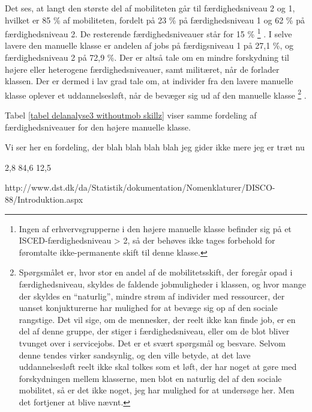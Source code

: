 Det ses, at langt den største del af mobiliteten går til færdighedsniveau 2 og 1, hvilket er 85 \% af mobiliteten, fordelt på 23 \% på færdighedsniveau 1 og 62 \% på færdighedsniveau 2. De resterende færdighedsniveauer står for 15 \%%
%
    \footnote{ Ingen af erhvervsgrupperne i den højere manuelle klasse befinder sig på et ISCED-færdighedsniveau > 2, så der behøves ikke tages forbehold for føromtalte ikke-permanente skift til denne klasse.}%
%
.  I selve lavere den manuelle klasse er andelen af jobs på færdigsniveau 1 på 27,1 \%, og færdighedsniveau 2 på 72,9 \%. Der er altså tale om en mindre forskydning til højere eller heterogene færdighedsniveauer, samt militæret, når de forlader klassen. Der er dermed i lav grad tale om, at individer fra den lavere manuelle klasse oplever et uddannelsesløft, når de bevæger sig ud af den manuelle klasse%
%
    \footnote{ Spørgsmålet er, hvor stor en andel af de mobilitetsskift, der foregår opad i færdighedsniveau, skyldes de faldende jobmuligheder i klassen, og hvor mange der skyldes en “naturlig”, mindre strøm af individer med ressourcer, der uanset konjukturerne har mulighed for at bevæge sig op af den sociale rangstige. Det vil sige, om de mennesker, der reelt ikke kan finde job, er en del af denne gruppe, der stiger i færdighedsniveau, eller om de blot bliver tvunget over i servicejobs. Det er et svært spørgsmål og besvare. Selvom denne tendes virker sandsynlig, og den ville betyde, at det lave uddannelsesløft reelt ikke skal tolkes som et løft, der har noget at gøre med forskydningen mellem klasserne, men blot en naturlig del af den sociale mobilitet, så er det ikke noget, jeg har mulighed for at undersøge her. Men det fortjener at blive nævnt.}%
%
. 

Tabel \ref{tabel delanalyse3 withoutmob skillz} viser samme fordeling af færdighedsniveauer for den højere manuelle klasse. 



Vi ser her en fordeling, der blah blah blah blah jeg gider ikke mere jeg er træt nu



2,8
84,6
12,5





\iffalse \label{iffalse}

http://www.dst.dk/da/Statistik/dokumentation/Nomenklaturer/DISCO-88/Introduktion.aspx%


